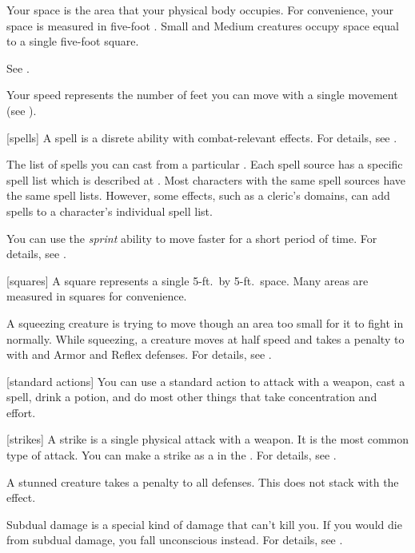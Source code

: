  Your space is the area that your physical body occupies.
For convenience, your space is measured in five-foot .
Small and Medium creatures occupy space equal to a single five-foot square.

 See .

 Your speed represents the number of feet you can move with a single movement (see ).

[spells] A spell is a disrete  ability with combat-relevant effects.
For details, see .

 The list of spells you can cast from a particular .
Each spell source has a specific spell list which is described at .
Most characters with the same spell sources have the same spell lists.
However, some effects, such as a cleric's domains, can add spells to a character's individual spell list.

 You can use the \textit{sprint} ability to move faster for a short period of time.
For details, see .

[squares] A square represents a single 5-ft.\ by 5-ft.\ space.
Many areas are measured in squares for convenience.

 A squeezing creature is trying to move though an area too small for it to fight in normally.
While squeezing, a creature moves at half speed and takes a  penalty to  with  and Armor and Reflex defenses.
For details, see .

[standard actions] You can use a standard action to attack with a weapon, cast a spell, drink a potion, and do most other things that take concentration and effort.

[strikes] A strike is a single physical attack with a weapon.
It is the most common type of attack.
You can make a strike as a  in the .
For details, see .

 A stunned creature takes a  penalty to all defenses.
This does not stack with the  effect.

 Subdual damage is a special kind of damage that can't kill you.
If you would die from subdual damage, you fall unconscious instead.
For details, see .

